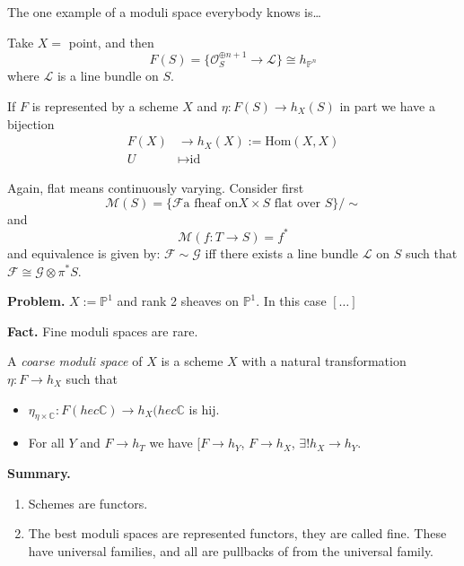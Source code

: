 The one example of a moduli space everybody
knows is\ldots{}

\begin{example}
\label{msos-label-016}
Take $X=$ point, and then
$$
F(S)=\{\mathcal{O}_S^{\oplus n+1}\to
\mathcal{L}\}\cong h_{\mathbb{P}^n}
$$
where $\mathcal{L}$ is a line bundle on $S$.
\end{example}

\begin{definition}
\label{definition-universal-family}
If $F$ is represented by a scheme $X$ and
$\eta:F(S)\to h_X(S)$ in part we have a
bijection
$$
\begin{aligned}
F(X) &\longrightarrow h_X(X):=\text{Hom}(X,X)
\\
U &\longmapsto \text{id}
\end{aligned}
$$
\end{definition}

\bigskip\noindent

Again, flat means continuously varying.
Consider first
$$
\mathcal{M}(S)=\{\mathcal{F}\text{a fheaf on
$X\times S$ flat over }S\}/\sim
$$
and
$$
\mathcal{M}(f:T \to S)=f^*
$$
and equivalence is given by: $\mathcal{F}\sim
\mathcal{G}$ iff there exists a line bundle
$\mathcal{L}$ on $S$ such that
$\mathcal{F}\cong \mathcal{G}\otimes\pi^*S$.

\medskip\noindent
{\bf Problem.} $X:=\mathbb{P}^1$ and rank 2
sheaves on $\mathbb{P}^1$. In this case
$[\ldots{}]$

\medskip\noindent
{\bf Fact.} Fine moduli spaces are rare.

\begin{definition}
\label{definition-coarse-moduli-space}
A {\it coarse moduli space} of  $X$ is a
scheme $X$ with a natural transformation
$\eta:F \to h_X$ such that
\begin{itemize}
\item $\eta_{\eta \times \mathbb{C}}:F(hec
\mathbb{C}) \to h_X(hec \mathbb{C}$
is hij.
\item For all $Y$ and $F \to h_T$ we have [$F
\to h_Y$, $F\to h_X$, $\exists !
h_X \to h_Y$.
\end{itemize}
\end{definition}

\medskip\noindent
{\bf Summary.}
\begin{enumerate}
\item Schemes are functors.
\item The best moduli spaces are represented
functors, they are called fine.
These have universal families, and all are
pullbacks of from the universal family.
\end{enumerate}

